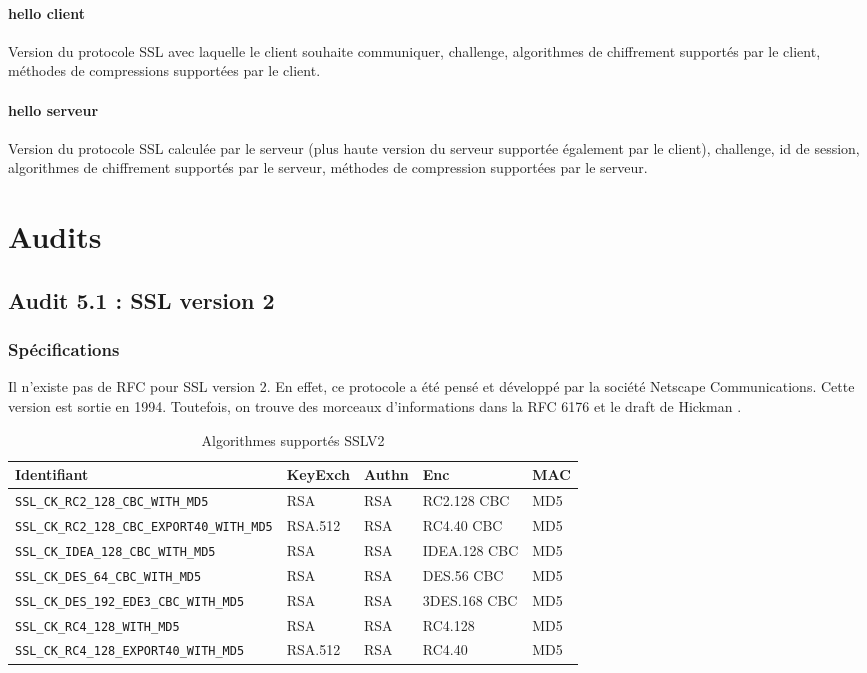 \paragraph{hello client}
Version du protocole SSL avec laquelle le client souhaite communiquer, challenge, algorithmes de chiffrement supportés par le client, méthodes de compressions supportées par le client.

\paragraph{hello serveur}
Version du protocole SSL calculée par le serveur (plus haute version du serveur supportée également par le client), challenge, id de session, algorithmes de chiffrement supportés par le serveur, méthodes de compression supportées par le serveur.


\section{Audits}
	\subsection{Audit 5.1 : SSL version 2 }
\subsubsection{Spécifications}
Il n'existe pas de RFC pour SSL version 2. En effet, ce protocole a été pensé et développé par la société Netscape Communications. Cette version est sortie en 1994. Toutefois, on trouve des morceaux d'informations dans la RFC 6176 \cite{rfc6176} et le draft de Hickman \cite{hickman1995}.


\begin{table}[H]
\centering
\begin{tabularx}{17cm}{|l|l|l|X|l|}
\hline
\textbf{Identifiant} & \textbf{KeyExch} & \textbf{Authn}& \textbf{Enc}& \textbf{MAC}\\
\hline
\verb+SSL_CK_RC2_128_CBC_WITH_MD5+&RSA&RSA&RC2.128 CBC&MD5\\
\hline
\verb+SSL_CK_RC2_128_CBC_EXPORT40_WITH_MD5+&RSA.512&RSA&RC4.40 CBC&MD5\\
\hline
\verb+SSL_CK_IDEA_128_CBC_WITH_MD5+&RSA&RSA&IDEA.128 CBC&MD5\\
\hline
\verb+SSL_CK_DES_64_CBC_WITH_MD5+&RSA&RSA&DES.56 CBC&MD5\\
\hline
\verb+SSL_CK_DES_192_EDE3_CBC_WITH_MD5+&RSA&RSA&3DES.168 CBC&MD5\\
\hline
\verb+SSL_CK_RC4_128_WITH_MD5+&RSA&RSA&RC4.128&MD5\\
\hline
\verb+SSL_CK_RC4_128_EXPORT40_WITH_MD5+&RSA.512&RSA&RC4.40&MD5\\
\hline
\end{tabularx}
\caption{Algorithmes supportés SSLV2}
\label{algos}
\end{table}

